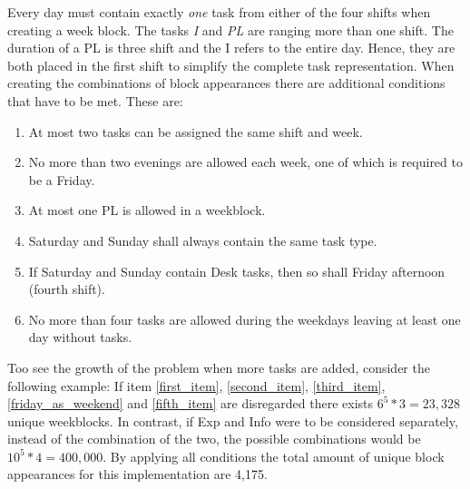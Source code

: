 Every day must contain exactly \textit{one} task from either of the four shifts when creating a week block. The tasks \textit{I} and \textit{PL} are ranging more than one shift. The duration of a PL is three shift and the I refers to the entire day. Hence, they are both placed in the first shift to simplify the complete task representation. When creating the combinations of block appearances there are additional conditions that have to be met. These are:
\begin{enumerate}  
\item At most two tasks can be assigned the same shift and week.\label{first_item}
\item No more than two evenings are allowed each week, one of which is required to be a Friday. \label{second_item}
\item At most one PL is allowed in a weekblock. \label{third_item}
\item Saturday and Sunday shall always contain the same task type.\label{fourth_item}
\item If Saturday and Sunday contain Desk tasks, then so shall Friday afternoon (fourth shift). \label{friday_as_weekend}
\item No more than four tasks are allowed during the weekdays leaving at least one day without tasks. \label{fifth_item}
\end{enumerate}

Too see the growth of the problem when more tasks are added, consider the following example: If item \ref{first_item}, \ref{second_item}, \ref{third_item}, \ref{friday_as_weekend} and \ref{fifth_item} are disregarded there exists $6^5*3 = 23,328$ unique weekblocks. In contrast, if Exp and Info were to be considered separately, instead of the combination of the two, the possible combinations would be $10^5*4 = 400,000$.  By applying all conditions the total amount of unique block appearances for this implementation are 4,175. 

